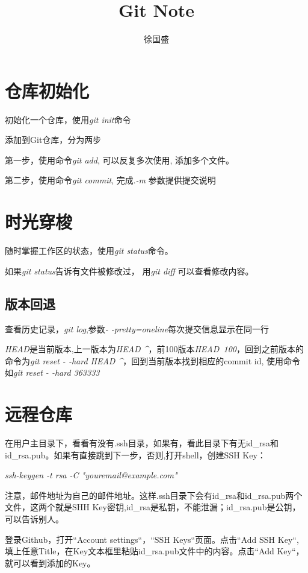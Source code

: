 \documentclass[UTF8]{ctexart}
\title{Git Note}
\author{徐国盛}
\begin{document}
\maketitle
\tableofcontents
\section{仓库初始化}

\textbullet 初始化一个仓库，使用\textit{git init}命令

\textbullet 添加到Git仓库，分为两步

\qquad \textbullet 第一步，使用命令\textit{git add}, 可以反复多次使用,
	添加多个文件。

\qquad \textbullet 第二步，使用命令\textit{git commit}, 完成.\textit{-m}
参数提供提交说明
\section{时光穿梭}
\textbullet 随时掌握工作区的状态，使用\textit{git status}命令。

\textbullet 如果\textit{git status}告诉有文件被修改过， 用\textit{git diff}
可以查看修改内容。
\subsection{版本回退}

\textbullet 查看历史记录，\textit{git log},参数\textit{- -pretty=oneline}每次提交信息显示在同一行

\textbullet \textit{HEAD}是当前版本,上一版本为\textit{HEAD \^}，前100版本\textit{HEAD~100}，回到之前版本的命令为\textit{git reset - -hard HEAD \^}，回到当前版本找到相应的commit id, 使用命令如\textit{git reset - -hard 363333}
\section{远程仓库}

\textbullet 在用户主目录下，看看有没有.ssh目录，如果有，看此目录下有无id\_rsa和id\_rsa.pub。如果有直接跳到下一步，否则,打开shell，创建SSH Key：

\textit{ssh-keygen -t rsa -C "youremail@example.com"}

注意，邮件地址为自己的邮件地址。这样.ssh目录下会有id\_rsa和id\_rsa.pub两个文件，这两个就是SHH Key密钥,id\_rsa是私钥，不能泄漏；id\_rsa.pub是公钥，可以告诉别人。

\textbullet 登录Github，打开“Account settings“，“SSH Keys“页面。点击“Add SSH Key“, 填上任意Title，在Key文本框里粘贴id\_rsa.pub文件中的内容。点击“Add Key“，就可以看到添加的Key。
\end{document}
